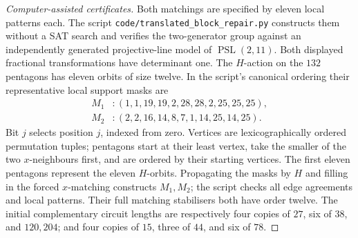 \documentclass[11pt,a4paper]{article}
\theoremstyle{definition}
\theoremstyle{remark}
\newcommand{\PSL}{\operatorname{PSL}}
\begin{document}
\begin{proof}[Computer-assisted certificates]
Both matchings are specified by eleven local patterns each.  The script \nolinkurl{code/translated_block_repair.py} constructs them without a SAT search and verifies the two-generator group against an independently generated projective-line model of $\PSL(2,11)$.  Both displayed fractional transformations have determinant one.  The $H$-action on the $132$ pentagons has eleven orbits of size twelve.  In the script's canonical ordering their representative local support masks are
\[
\begin{split}
 M_1 &: (1,1,19,19,2,28,28,2,25,25,25),\\
 M_2 &: (2,2,16,14,8,7,1,14,25,14,25).
\end{split}
\]
Bit $j$ selects position $j$, indexed from zero.  Vertices are lexicographically ordered permutation tuples; pentagons start at their least vertex, take the smaller of the two $x$-neighbours first, and are ordered by their starting vertices.  The first eleven pentagons represent the eleven $H$-orbits.  Propagating the masks by $H$ and filling in the forced $x$-matching constructs $M_1,M_2$; the script checks all edge agreements and local patterns.  Their full matching stabilisers both have order twelve.  The initial complementary circuit lengths are respectively four copies of $27$, six of $38$, and $120,204$; and four copies of $15$, three of $44$, and six of $78$.


\end{proof}
\end{document}
